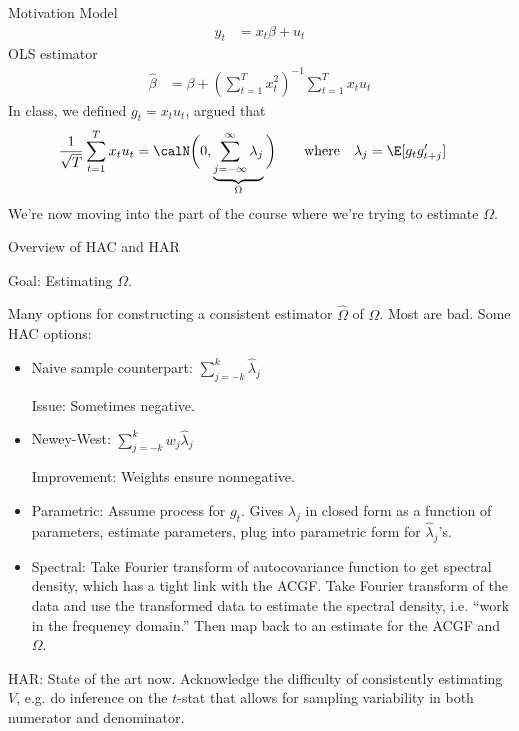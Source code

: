 \documentclass[handout]{beamer}
\newcommand{\sumtT}{\sum^T_{t=1}}
\begin{document}
\begin{frame}[shrink]{Motivation}
Model
\begin{align*}
  y_t &= x_t \beta + u_t
\end{align*}
OLS estimator
\begin{align*}
  \hat{\beta}
  &=
  \beta
  +
  \left(
  \sumtT x_t^2
  \right)^{-1}
  \sumtT x_tu_t
\end{align*}
In class, we defined $g_t=x_tu_t$, argued that
\begin{align*}
  \frac{1}{\sqrt{T}}
  \sumtT x_tu_t
  &=
  \calN\bigg(
  0,
  \underbrace{%
    \sum_{j=-\infty}^\infty
    \lambda_j
  }_{\Omega}
  \bigg)
  \qquad\text{where}\quad
  \lambda_j
  =
  \E[g_tg_{t+j}']
\end{align*}
We're now moving into the part of the course where we're trying to
estimate $\Omega$.
\end{frame}


\begin{frame}[shrink]{Overview of HAC and HAR}

Goal: Estimating $\Omega$.

Many options for constructing a consistent estimator $\hat{\Omega}$ of
$\Omega$.
Most are bad.
Some HAC options:
\begin{itemize}
  \item Naive sample counterpart:
    $\sum_{j=-k}^k \hat{\lambda}_j$

    \alert{Issue}: Sometimes negative.

  \item \alert{Newey-West}:
    $\sum_{j=-k}^k w_j \hat{\lambda}_j$

    \alert{Improvement}: Weights ensure nonnegative.

  \item
    \alert{Parametric}:
    Assume process for $g_t$. Gives $\lambda_j$ in closed form as
    a function of parameters, estimate parameters, plug into parametric
    form for $\hat{\lambda}_j$'s.

  \item
    \alert{Spectral}:
    Take Fourier transform of autocovariance function to get spectral
    density, which has a tight link with the ACGF.
    Take Fourier transform of the data and use the transformed data to
    estimate the spectral density, i.e. ``work in the frequency
    domain.'' Then map back to an estimate for the ACGF and $\Omega$.
\end{itemize}
HAR: State of the art now.
Acknowledge the difficulty of consistently estimating $V$, e.g.
do inference on the $t$-stat that allows for sampling variability in
\alert{both} numerator and denominator.
\end{frame}
\end{document}
